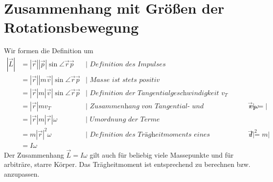 \documentclass[11pt]{article}
\begin{document}
\section{Zusammenhang mit Größen der Rotationsbewegung}
Wir formen die Definition um
\begin{align*}
        |\vec{L}| &= |\vec{r}||\vec{p}|\sin \angle \vec{r} \vec{p} &|\textit{ Definition des Impulses} \\
        &= |\vec{r}||m\vec{v}|\sin \angle \vec{r} \vec{p} &|\textit{ Masse ist stets positiv} \\
        &= |\vec{r}|m|\vec{v}|\sin \angle \vec{r} \vec{p} &|\textit{ Definition der Tangentialgeschwindigkeit } v_T \\
        &= |\vec{r}|mv_T &|\textit{ Zusammenhang von Tangential- und Winkelgeschwindigkeit, } v_T = |\vec{r}|\omega \\
        &= |\vec{r}|m|\vec{r}|\omega &|\textit{ Umordnung der Terme}\\ 
        &= m|\vec{r}|^2\omega &|\textit{ Definition des Trägheitmoments eines Massepunkts } I = m|\vec{r}|^2 \\
        &= I\omega
\end{align*}
Der Zusammenhang $\vec{L} = I \omega$ gilt auch für beliebig viele Massepunkte und für arbiträre, starre Körper. Das Trägheitmoment ist entsprechend zu berechnen bzw. anzupassen. 
\end{document}
